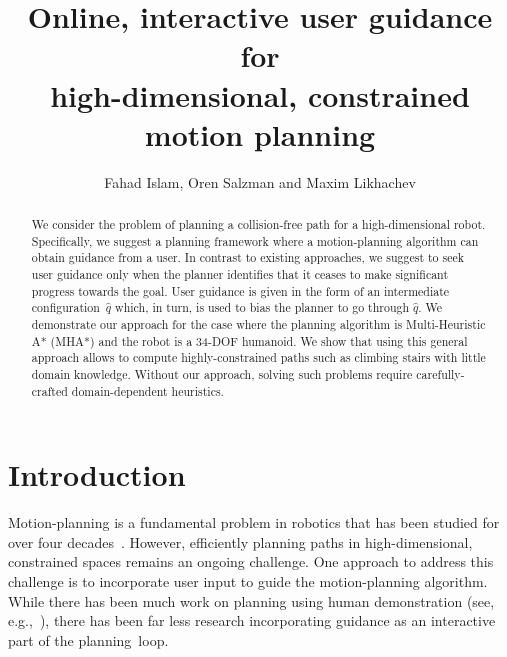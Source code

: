 \documentclass[conference]{IEEEtran}
\begin{document}
\title{	Online, interactive user guidance for \\
		high-dimensional, constrained motion planning }

\author{Fahad Islam, Oren Salzman and Maxim Likhachev}


\maketitle
\thispagestyle{empty}
\pagestyle{empty}



\begin{abstract}
We consider the problem of planning a collision-free path for a high-dimensional robot.
Specifically, we suggest a planning framework where a motion-planning algorithm can obtain guidance from a user.
In contrast to existing approaches, we suggest to seek user guidance only when the planner identifies that it ceases to make significant progress towards the goal.
User guidance is given in the form of an intermediate configuration~$\hat{q}$ which, in turn, is used to bias the planner to go through $\hat{q}$.
We demonstrate our approach for the case where the planning algorithm is Multi-Heuristic A* (MHA*) and the robot is a 34-DOF humanoid.
We show that using this general approach allows to compute highly-constrained paths such as climbing stairs with little domain knowledge.
Without our approach, solving such problems require carefully-crafted domain-dependent  heuristics. 
\end{abstract}

\IEEEpeerreviewmaketitle

\section{Introduction}
\label{sec:intro}

Motion-planning is a fundamental problem in robotics that has been studied for over four decades~\cite{CBHKKLT05,L06,S04}.
However, efficiently planning paths in high-dimensional, constrained spaces remains an ongoing challenge.
One approach to address this challenge is to incorporate user input to guide the motion-planning algorithm.
While there has been much work on planning using human demonstration 
(see, e.g.,~\cite{ACVB09, HS16, PHCL16, SHLA16, YA17}), 
there has been far less research incorporating guidance as an interactive part of the planning~loop.
\end{document}
